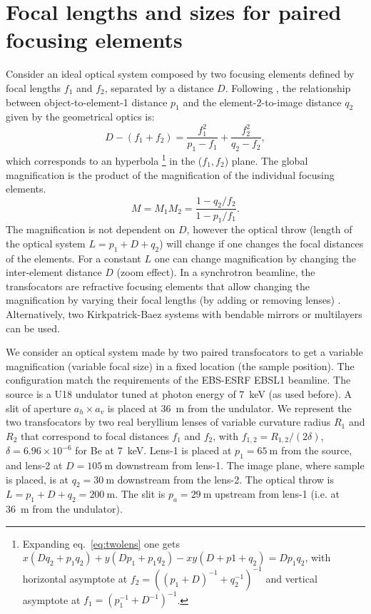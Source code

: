 \documentclass[doublecol]{epl2}
\begin{document}
\section{Focal lengths and sizes for paired focusing elements}

Consider an ideal optical system composed by two focusing elements defined by focal lengths $f_1$ and $f_2$, separated by a distance $D$. Following \cite{Goodman85}, the relationship between object-to-element-1 distance $p_1$ and the element-2-to-image distance $q_2$ given by the geometrical optics is:
\begin{equation}
\label{eq:twolens}
    D-(f_1+f_2)=\frac{f_1^2}{p_1-f_1} + \frac{f_2^2}{q_2-f_2},
\end{equation}
which corresponds to an hyperbola
\footnote{Expanding eq.~\ref{eq:twolens} one gets $x(D q_2 + p_1 q_2) + y (D p_1 + p_1 q_2) - x y (D + p1 + q_2) = D p_1 q_2$,  with horizontal asymptote at $f_{2}=((p_1+D)^{-1}+q_2^{-1})^{-1}$ and vertical asymptote at $f_{1}=(p_1^{-1}+D^{-1})^{-1}$.} in the ($f_1,f_2$) plane.
The global magnification is the product of the magnification of the individual focusing elements.
\begin{equation}
\label{eq:magnification}
    M=M_1 M_2=\frac{1-q_2/f_2}{1-p_1/f_1}.
\end{equation}
The magnification is not dependent on $D$, however the optical throw (length of the optical system $L=p_1+D+q_2$) will change if one changes the focal distances of the elements. For a constant $L$ one can change magnification by changing the inter-element distance $D$ (zoom effect). In a synchrotron beamline, the transfocators are refractive focusing elements that allow changing the magnification by varying their focal lengths (by adding or removing lenses) \cite{Vaughan:kv5084}. Alternatively, two Kirkpatrick-Baez systems with bendable mirrors or multilayers can be used. 

We consider an optical system made by two paired transfocators to get a variable magnification (variable focal size) in a fixed location (the sample position). The configuration match the requirements of the EBS-ESRF EBSL1 beamline. 
The source is a U18 undulator tuned at photon energy of \SI{7}{keV} (as used before). A slit of aperture $a_h \times a_v$ is placed at \SI{36}{\meter} from the undulator.  
We represent the two transfocators by two real beryllium lenses of variable curvature radius $R_1$ and $R_2$ that correspond to focal distances $f_1$ and $f_2$, with $f_{1,2}=R_{1,2}/(2 \delta)$, $\delta=6.96\times10^{-6}$ for Be at \SI{7}{keV}. Lens-1 is placed at $p_1=\SI{65}{\meter}$ from the source, and lens-2 at $D=\SI{105}{\meter}$ downstream from lens-1. The image plane, where sample is placed, is at $q_2=\SI{30}{\meter}$ downstream from the lens-2. The optical throw is $L=p_1+D+q_2=\SI{200}{\meter}$. The slit is $p_a=\SI{29}{\meter}$ upstream from lens-1 (i.e. at \SI{36}{\meter} from the undulator). 
\end{document}
